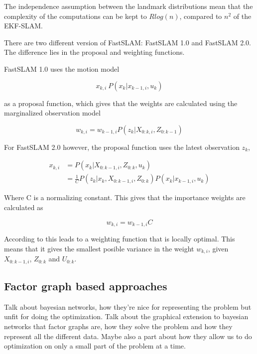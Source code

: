 The independence assumption between the landmark distributions mean that the complexity of the computations can be kept to $Rlog(n)$, compared to $n^2$ of the EKF-SLAM. 

There are two different version of FastSLAM: FastSLAM 1.0\cite{FastSLAM1} and FastSLAM 2.0\cite{FastSLAM2}. The difference lies in the proposal and weighting functions. 

FastSLAM 1.0 uses the motion model 

\begin{equation}
    x_{k,i} ~ P(x_k|x_{k-1,i},u_k)
\end{equation}

as a proposal function, which gives that the weights are calculated using the marginalized observation model

\begin{equation}
    w_{k,i} = w_{k-1,i}P(z_k|X_{0:k,i},Z_{0:k-1})
\end{equation}

For FastSLAM 2.0 however, the proposal function uses the latest observation $z_k$,

\begin{align}
    x_{k,i} &= P(x_k|X_{0:k-1,i},Z_{0:k},u_k) \\
    &= \frac{1}{C}P(z_k|x_k,X_{0:k-1,i},Z_{0:k})P(x_k|x_{k-1,i},u_k)
\end{align}

Where C is a normalizing constant. This gives that the importance weights are calculated as

\begin{equation}
    w_{k,i} = w_{k-1,i}C
\end{equation}

According to \cite{SLAMIntro} this leads to a weighting function that is locally optimal. This means that it gives the smallest posible variance in the weight $w_{k,i}$, given $X_{0:k-1,i}$, $Z_{0:k}$ and $U_{0:k}$.

\subsection{Factor graph based approaches}

Talk about bayesian networks, how they're nice for representing the problem but unfit for doing the optimization. Talk about the graphical extension to bayesian networks that factor graphs are, how they solve the problem and how they represent all the different data. Maybe also a part about how they allow us to do optimization on only a small part of the problem at a time. 

